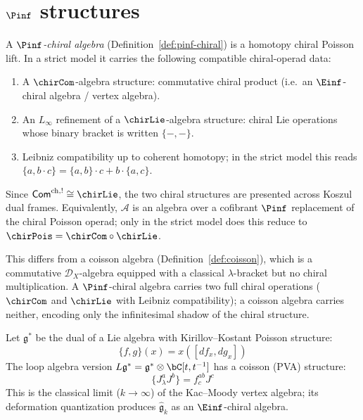 \section{\texorpdfstring{$\Pinf$ structures}{Pinf structures}}
\label{sec:pinf-structures}
\begin{definition}\label{def:pinf-chiral-detailed}
A \emph{$\Pinf$-chiral algebra} (Definition~\ref{def:pinf-chiral}) is
a homotopy chiral Poisson lift. In a strict model it carries the
following compatible chiral-operad data:
\begin{enumerate}[label=(\roman*)]
\item A $\chirCom$-algebra structure: commutative chiral product (i.e.\
 an $\Einf$-chiral algebra / vertex algebra).
\item An $L_\infty$ refinement of a $\chirLie$-algebra structure:
 chiral Lie operations whose binary bracket is written $\{-, -\}$.
\item Leibniz compatibility up to coherent homotopy; in the strict
 model this reads
 $\{a, b \cdot c\} = \{a, b\} \cdot c + b \cdot \{a, c\}$.
\end{enumerate}
Since $\mathsf{Com}^{\mathrm{ch},!} \cong \chirLie$, the two chiral structures are
presented across Koszul dual frames.
Equivalently, $\mathcal{A}$ is an algebra over a cofibrant
$\Pinf$ replacement of the chiral Poisson operad; only in the
strict model does this reduce to
$\chirPois = \chirCom \circ \chirLie$.

This differs from a coisson algebra
(Definition~\ref{def:coisson}), which is a commutative
$\mathcal{D}_X$-algebra equipped with a classical $\lambda$-bracket
but no chiral multiplication. A $\Pinf$-chiral algebra carries two
full chiral operations ($\chirCom$ and $\chirLie$ with Leibniz
compatibility); a coisson algebra carries neither, encoding only
the infinitesimal shadow of the chiral structure.
\end{definition}

\begin{example}\label{ex:classical-affine}
Let $\mathfrak{g}^*$ be the dual of a Lie algebra with Kirillov--Kostant Poisson structure:
\[
\{f, g\}(x) = x([df_x, dg_x])
\]
The loop algebra version $L\mathfrak{g}^* = \mathfrak{g}^* \otimes \bC[t, t^{-1}]$ has a
coisson (PVA) structure:
\[
\{J^a_\lambda J^b\} = f^{ab}_c J^c
\]
This is the classical limit ($k \to \infty$) of the Kac--Moody vertex algebra;
its deformation quantization produces $\hat{\mathfrak{g}}_k$ as an $\Einf$-chiral
algebra.
\end{example}


